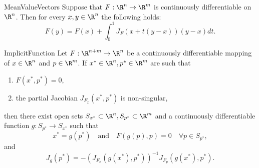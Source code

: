 
\newpage

\begin{app}{MeanValueVectors}
    Suppose that $F: \R^n \to \R^m$ is continuously differentiable on $\R^n$. Then for every $x,y \in \R^n$ the following holds: 
    \begin{equation*}
        F(y) = F(x) + \int_0^1 J_F(x + t(y - x)) (y - x) dt.
    \end{equation*}
    \vspace{-0.3cm}
\end{app}

\begin{theo}{ImplicitFunction}
    Let $F: \R^{n+m} \rightarrow \R^n$ be a continuously differentiable mapping of $x \in \R^n$ and $p \in \R^m$. If $x^* \in \R^n, p^* \in \R^m$ are such that 
    \begin{enumerate}
        \item $F(x^*, p^*) = 0$,
        \item the partial Jacobian $J_{F_x}(x^*, p^*)$ is non-singular,
    \end{enumerate}
    then there exist open sets $S_{x^*} \subset \R^n, S_{p^*} \subset \R^m$ and a continuously differentiable function $g: S_{p^*} \rightarrow S_{x^*}$ such that 
    \begin{equation*}
        x^* = g(p^*) \quad \text{and} \quad F(g(p), p) = 0 \quad \forall p \in S_{p^*},
    \end{equation*}
    and 
    \begin{equation*}
        J_g(p^*) = -{(J_{F_x}(g(x^*), p^*))}^{-1} J_{F_p}(g(x^*), p^*).
    \end{equation*}
    \vspace*{-0.5cm}
\end{theo}